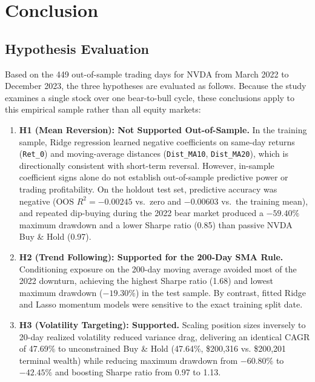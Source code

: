 \documentclass[11pt, a4paper]{article}
\begin{document}
\section{Conclusion}
\label{sec:conclusion}

\subsection{Hypothesis Evaluation}
Based on the 449 out-of-sample trading days for NVDA from March 2022 to December 2023, the three hypotheses are evaluated as follows. Because the study examines a single stock over one bear-to-bull cycle, these conclusions apply to this empirical sample rather than all equity markets:
\begin{enumerate}
    \item \textbf{H1 (Mean Reversion): Not Supported Out-of-Sample.} In the training sample, Ridge regression learned negative coefficients on same-day returns (\texttt{Ret\_0}) and moving-average distances (\texttt{Dist\_MA10}, \texttt{Dist\_MA20}), which is directionally consistent with short-term reversal. However, in-sample coefficient signs alone do not establish out-of-sample predictive power or trading profitability. On the holdout test set, predictive accuracy was negative ($\text{OOS } R^2 = -0.00245$ vs.\ zero and $-0.00603$ vs.\ the training mean), and repeated dip-buying during the 2022 bear market produced a $-59.40\%$ maximum drawdown and a lower Sharpe ratio (0.85) than passive NVDA Buy \& Hold (0.97).
    \item \textbf{H2 (Trend Following): Supported for the 200-Day SMA Rule.} Conditioning exposure on the 200-day moving average avoided most of the 2022 downturn, achieving the highest Sharpe ratio (1.68) and lowest maximum drawdown ($-19.30\%$) in the test sample. By contrast, fitted Ridge and Lasso momentum models were sensitive to the exact training split date.
    \item \textbf{H3 (Volatility Targeting): Supported.} Scaling position sizes inversely to 20-day realized volatility reduced variance drag, delivering an identical CAGR of 47.69\% to unconstrained Buy \& Hold (47.64\%, \$200,316 vs. \$200,201 terminal wealth) while reducing maximum drawdown from $-60.80\%$ to $-42.45\%$ and boosting Sharpe ratio from 0.97 to 1.13.
\end{enumerate}
\end{document}
